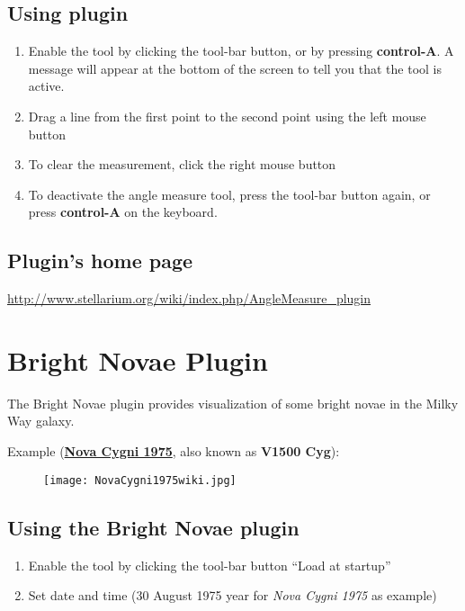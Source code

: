 \subsection{Using plugin}\label{using-plugin}

\begin{enumerate}
\item
  Enable the tool by clicking the tool-bar button, or by pressing
  \textbf{control-A}. A message will appear at the bottom of the screen
  to tell you that the tool is active.
\item
  Drag a line from the first point to the second point using the left
  mouse button
\item
  To clear the measurement, click the right mouse button
\item
  To deactivate the angle measure tool, press the tool-bar button again,
  or press \textbf{control-A} on the keyboard.
\end{enumerate}

\subsection{Plugin's home page}\label{plugins-home-page}

\url{http://www.stellarium.org/wiki/index.php/AngleMeasure_plugin}

\section{Bright Novae Plugin}\label{bright-novae-plugin}

The Bright Novae plugin provides visualization of some bright novae in
the Milky Way galaxy.

Example (\href{http://en.wikipedia.org/wiki/V1500_Cygni}{\textbf{Nova
Cygni 1975}}, also known as \textbf{V1500 Cyg}):

\begin{figure}[h]
\centering\texttt{[image: NovaCygni1975wiki.jpg]}
\end{figure}

\subsection{Using the Bright Novae plugin}\label{Using-bright-novae-plugin}

\begin{enumerate}
\item
  Enable the tool by clicking the tool-bar button ``Load at startup''
\item
  Set date and time (30 August 1975 year for \emph{Nova Cygni 1975} as
  example)
\end{enumerate}

